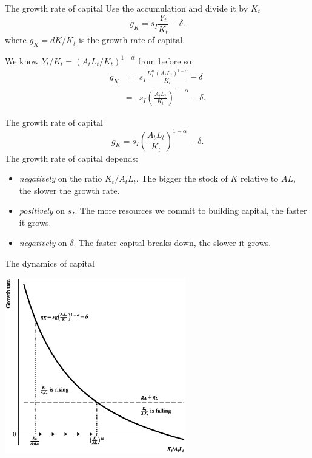 \begin{frame}{The growth rate of capital}
Use the accumulation and divide it by $K_t$
\begin{equation}
	g_K = s_I \frac{Y_t}{K_t} - \delta. \nonumber
\end{equation}
where $g_K = dK/K_t$ is the growth rate of capital. 

\vspace{.25in}\noindent We know $Y_t/K_t = (A_tL_t/K_t)^{1-\alpha}$ from before so
\begin{eqnarray}
	g_K &=& s_I \frac{K_t^{\alpha}(A_tL_t)^{1-\alpha}}{K_t} - \delta \nonumber \\ 
	    &=& s_I \left(\frac{A_tL_t}{K_t}\right)^{1-\alpha} - \delta. \label{EQ_gK_KAL}
\end{eqnarray}
\end{frame}

\begin{frame}{The growth rate of capital}
\begin{equation}
	g_K = s_I \left(\frac{A_tL_t}{K_t}\right)^{1-\alpha} - \delta. \label{EQ_gK_KAL}
\end{equation}
The growth rate of capital depends:
\begin{itemize}
	\item \textit{negatively} on the ratio $K_t/A_t L_t$. The bigger the stock of $K$ relative to $AL$, the slower the growth rate.
	\item \textit{positively} on $s_I$. The more resources we commit to building capital, the faster it grows.
	\item \textit{negatively} on $\delta$. The faster capital breaks down, the slower it grows.
\end{itemize}

\end{frame}

\begin{frame}{The dynamics of capital}
\begin{center}
\includegraphics[height = 3in]{../Figures/fig-ch2-fig2.eps}
\end{center}
\end{frame}

